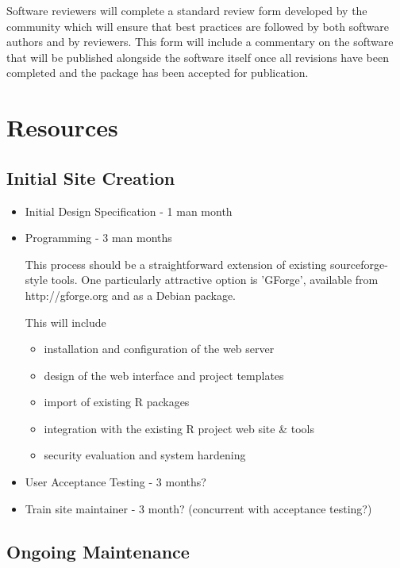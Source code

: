 \documentclass[12pt]{article}
\begin{document}
Software reviewers will complete a standard review form developed by
the community which will ensure that best practices are followed by
both software authors and by reviewers.	 This form will include a
commentary on the software that will be published alongside the
software itself once all revisions have been completed and the package
has been accepted for publication.

\section{Resources}

\subsection{Initial Site Creation}

\begin{itemize}
\item Initial Design Specification - 1 man month

\item Programming - 3 man months

	This process should be a straightforward extension of existing
	sourceforge-style tools.	One particularly attractive option is
	'GForge', available from http://gforge.org and as a Debian package.

	This will include
	\begin{itemize}
	\item installation and configuration of the web server
	\item design of the web interface and project templates
	\item import of existing R packages
	\item integration with the existing R project web site \& tools
	\item security evaluation and system hardening
	\end{itemize}

\item User Acceptance Testing - 3 months?

\item Train site maintainer - 3 month?	(concurrent with acceptance testing?)

\end{itemize}

\subsection{Ongoing Maintenance}
\end{document}

